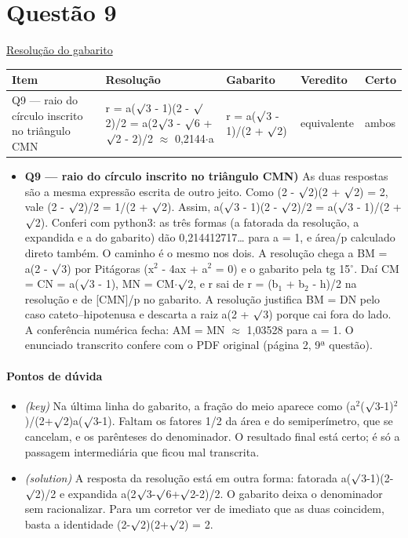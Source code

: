 \documentclass{article}%
\begin{document}
\section*{Questão 9}%
\href{https://poliedroresolve.sistemapoliedro.com.br/vestibulares/ime/2026/ime-2-fase-dia-1-23-10-2025-2-fase-dia-1/dissertativa-9-matematica-2-fase-dia-1-ime-2026}{Resolução do gabarito}\par\smallskip%
\begin{longtable}{@{}p{} p{} p{} p{} p{}@{}}\toprule Item & Resolução & Gabarito & Veredito & Certo \\ \midrule
Q9 --- raio do círculo inscrito no triângulo CMN & r = a($\surd$3 - 1)(2 - $\surd$2)/2 = a(2$\surd$3 - $\surd$6 + $\surd$2 - 2)/2 $\approx$ 0,2144$\cdot$a & r = a($\surd$3 - 1)/(2 + $\surd$2) & equivalente & ambos \\
\bottomrule\end{longtable}%
\begin{itemize}%
\item%
\textbf{Q9 --- raio do círculo inscrito no triângulo CMN)} As duas respostas são a mesma expressão escrita de outro jeito. Como (2 - $\surd$2)(2 + $\surd$2) = 2, vale (2 - $\surd$2)/2 = 1/(2 + $\surd$2). Assim, a($\surd$3 - 1)(2 - $\surd$2)/2 = a($\surd$3 - 1)/(2 + $\surd$2). Conferi com python3: as três formas (a fatorada da resolução, a expandida e a do gabarito) dão 0,214412717\ldots{} para a = 1, e área/p calculado direto também. O caminho é o mesmo nos dois. A resolução chega a BM = a(2 - $\surd$3) por Pitágoras (x$^2$ - 4ax + a$^2$ = 0) e o gabarito pela tg 15$^\circ$. Daí CM = CN = a($\surd$3 - 1), MN = CM$\cdot$$\surd$2, e r sai de r = (b$_{1}$ + b$_{2}$ - h)/2 na resolução e de {[}CMN{]}/p no gabarito. A resolução justifica BM = DN pelo caso cateto--hipotenusa e descarta a raiz a(2 + $\surd$3) porque cai fora do lado. A conferência numérica fecha: AM = MN $\approx$ 1,03528 para a = 1. O enunciado transcrito confere com o PDF original (página 2, 9ª questão).%
\end{itemize}%
\paragraph{Pontos de dúvida}%
\begin{itemize}%
\item%
\textit{(key)} Na última linha do gabarito, a fração do meio aparece como (a$^2$($\surd$3-1)$^2$)/(2+$\surd$2)a($\surd$3-1). Faltam os fatores 1/2 da área e do semiperímetro, que se cancelam, e os parênteses do denominador. O resultado final está certo; é só a passagem intermediária que ficou mal transcrita.%
\item%
\textit{(solution)} A resposta da resolução está em outra forma: fatorada a($\surd$3-1)(2-$\surd$2)/2 e expandida a(2$\surd$3-$\surd$6+$\surd$2-2)/2. O gabarito deixa o denominador sem racionalizar. Para um corretor ver de imediato que as duas coincidem, basta a identidade (2-$\surd$2)(2+$\surd$2) = 2.%
\end{itemize}%
\end{document}

